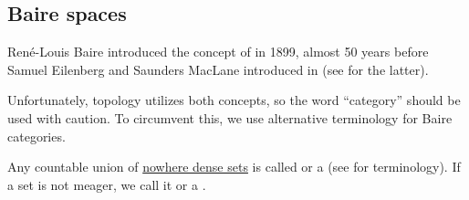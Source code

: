 \subsection{Baire spaces}\label{subsec:baire_spaces}

\begin{remark}\label{rem:baire_categories}
  René-Louis Baire introduced the concept of  in 1899, almost 50 years before Samuel Eilenberg and Saunders MacLane introduced  in \cite{EilenbergMacLane1945} (see  for the latter).

  Unfortunately, topology utilizes both concepts, so the word \enquote{category} should be used with caution. To circumvent this, we use alternative terminology for Baire categories.
\end{remark}

\begin{definition}\label{def:meager_set}
  Any countable union of \hyperref[def:topologically_dense_set/nowhere_dense]{nowhere dense sets} is called  or a  (see  for terminology). If a set is not meager, we call it  or a .
\end{definition}

